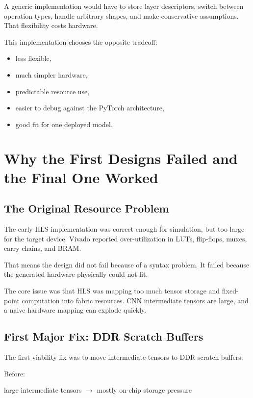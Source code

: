 \documentclass[11pt]{article}
\begin{document}
A generic implementation would have to store layer descriptors, switch between operation types, handle arbitrary shapes, and make conservative assumptions.
That flexibility costs hardware.

This implementation chooses the opposite tradeoff:

\begin{itemize}[leftmargin=1.4em]
  \item less flexible,
  \item much simpler hardware,
  \item predictable resource use,
  \item easier to debug against the PyTorch architecture,
  \item good fit for one deployed model.
\end{itemize}

\section{Why the First Designs Failed and the Final One Worked}

\subsection{The Original Resource Problem}

The early HLS implementation was correct enough for simulation, but too large for the target device.
Vivado reported over-utilization in LUTs, flip-flops, muxes, carry chains, and BRAM.

That means the design did not fail because of a syntax problem.
It failed because the generated hardware physically could not fit.

The core issue was that HLS was mapping too much tensor storage and fixed-point computation into fabric resources.
CNN intermediate tensors are large, and a naive hardware mapping can explode quickly.

\subsection{First Major Fix: DDR Scratch Buffers}

The first viability fix was to move intermediate tensors to DDR scratch buffers.

Before:

\begin{center}
large intermediate tensors \(\rightarrow\) mostly on-chip storage pressure
\end{center}
\end{document}
